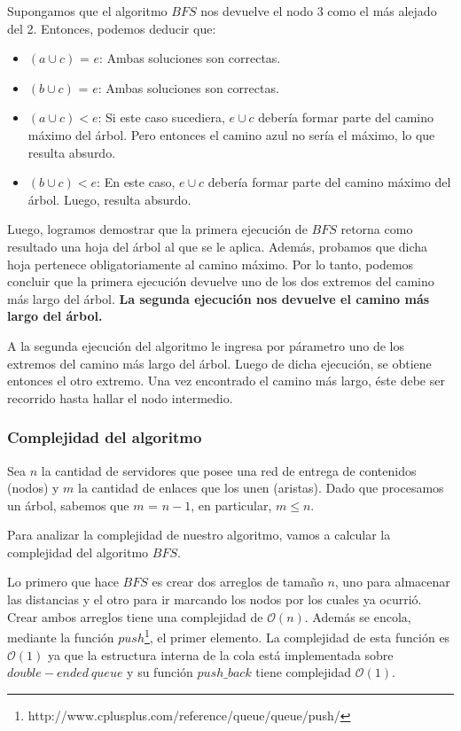 \begin{itemize}
Supongamos que el algoritmo $BFS$ nos devuelve el nodo 3 como el más alejado del 2. Entonces, podemos deducir que:
\begin {itemize}
\item $(a \cup c)$ = $e$: Ambas soluciones son correctas.
\item $(b \cup c)$ = $e$: Ambas soluciones son correctas.
\item $(a \cup c) < e$: Si este caso sucediera, $e \cup c$ debería formar parte del camino máximo del árbol. Pero entonces el camino azul no sería el máximo, lo que resulta absurdo.
\item $(b \cup c) < e$: En este caso, $e \cup c$ debería formar parte del camino máximo del árbol. Luego, resulta absurdo.
\newline
\end{itemize}
\end{itemize}

Luego, logramos demostrar que la primera ejecución de $BFS$ retorna como resultado una hoja del árbol al que se le aplica. Además, probamos que dicha hoja pertenece obligatoriamente al camino máximo. Por lo tanto, podemos concluir que la primera ejecución devuelve uno de los dos extremos del camino más largo del árbol. \newline
\newline
\textbf{La segunda ejecución nos devuelve el camino más largo del árbol.} \newline

A la segunda ejecución del algoritmo le ingresa por párametro uno de los extremos del camino más largo del árbol. Luego de dicha ejecución, se obtiene entonces el otro extremo. Una vez encontrado el camino más largo, éste debe ser recorrido hasta hallar el nodo intermedio.
\subsubsection{Complejidad del algoritmo}

Sea $n$ la cantidad de servidores que posee una red de entrega de contenidos (nodos) y $m$ la cantidad de enlaces que los unen (aristas). Dado que procesamos un árbol, sabemos que $m$ = $n-1$, en particular, $m \leq n$.\newline

Para analizar la complejidad de nuestro algoritmo, vamos a calcular la complejidad del algoritmo $BFS$.
\newline

Lo primero que hace $BFS$ es crear dos arreglos de tamaño $n$, uno para almacenar las distancias y el otro para ir marcando los nodos por los cuales ya ocurrió. Crear ambos arreglos tiene una complejidad de $\mathcal{O}(n)$. Además se encola, mediante la función $push$\footnote{http://www.cplusplus.com/reference/queue/queue/push/}, el primer elemento. La complejidad de esta función es $\mathcal{O}(1)$ ya que la estructura interna de la cola está implementada sobre $double-ended\ queue$ y su función $push\_back$ tiene complejidad $\mathcal{O}(1)$.
\newline

